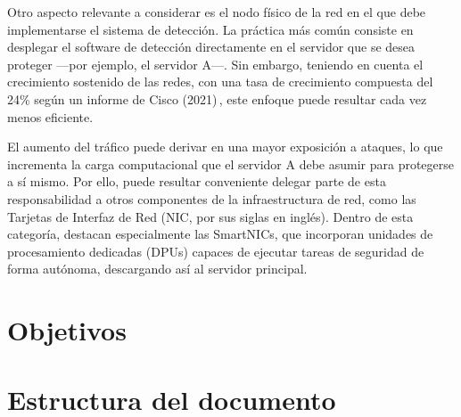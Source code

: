 Otro aspecto relevante a considerar es el nodo físico de la red en el que debe implementarse el sistema de detección. La práctica más común consiste en desplegar el software de detección directamente en el servidor que se desea proteger —por ejemplo, el servidor A—. Sin embargo, teniendo en cuenta el crecimiento sostenido de las redes, con una tasa de crecimiento compuesta del 24\% según un informe de Cisco (2021) \cite{Cisco2021}, este enfoque puede resultar cada vez menos eficiente.

El aumento del tráfico puede derivar en una mayor exposición a ataques, lo que incrementa la carga computacional que el servidor A debe asumir para protegerse a sí mismo. Por ello, puede resultar conveniente delegar parte de esta responsabilidad a otros componentes de la infraestructura de red, como las Tarjetas de Interfaz de Red (NIC, por sus siglas en inglés). Dentro de esta categoría, destacan especialmente las SmartNICs, que incorporan unidades de procesamiento dedicadas (DPUs) capaces de ejecutar tareas de seguridad de forma autónoma, descargando así al servidor principal.

\section{Objetivos}

\section{Estructura del documento}

